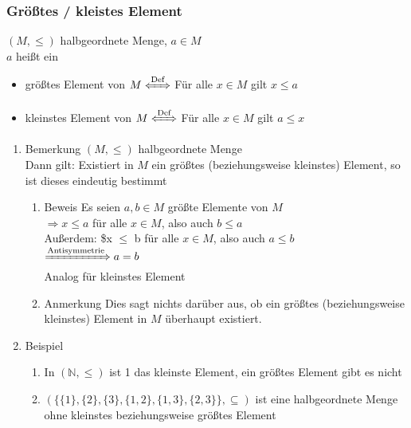 \documentclass[11pt]{article}
\begin{document}
\subsubsection{Größtes / kleistes Element}
\label{sec-2-5-4}
$(M, \leq)$ halbgeordnete Menge, $a\in M$ \\
    $a$ heißt ein
\begin{itemize}
\item größtes Element von $M\xLeftrightarrow{\text{Def}}$ Für alle $x\in M$ gilt $x\leq a$
\item kleinstes Element von $M\xLeftrightarrow{\text{Def}}$ Für alle $x\in M$ gilt $a\leq x$
\end{itemize}
\begin{enumerate}
\item Bemerkung
\label{sec-2-5-4-1}
$(M,\leq)$ halbgeordnete Menge \\
     Dann gilt: Existiert in $M$ ein größtes (beziehungsweise kleinstes) Element, so ist dieses eindeutig bestimmt
\begin{enumerate}
\item Beweis
\label{sec-2-5-4-1-1}
Es seien $a,b\in M$ größte Elemente von $M$ \\
      $\Rightarrow x\leq a$ für alle $x\in M$, also auch $b\leq a$ \\
      Außerdem: \$x $\le$ b für alle $x\in M$, also auch $a\leq b$ \\
      $\xRightarrow{\text{Antisymmetrie}} a = b$ \\
      Analog für kleinstes Element
\item Anmerkung
\label{sec-2-5-4-1-2}
Dies sagt nichts darüber aus, ob ein größtes (beziehungsweise kleinstes) Element in $M$ überhaupt existiert.
\end{enumerate}
\item Beispiel
\label{sec-2-5-4-2}
\begin{enumerate}
\item In $(\mathbb{N},\leq)$ ist 1 das kleinste Element, ein größtes Element gibt es nicht
\item $(\{\{1\},\{2\},\{3\},\{1,2\},\{1,3\},\{2,3\}\}, \subseteq)$ ist eine halbgeordnete Menge ohne kleinstes beziehungsweise größtes Element
\end{enumerate}
\end{enumerate}
\end{document}
